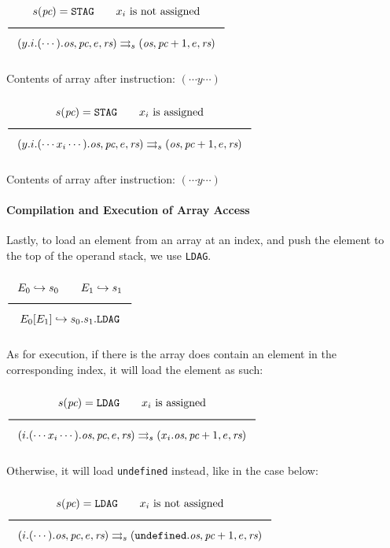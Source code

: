 $\Rule{s(\textit{pc}) = \texttt{STAG} \qquad x_i \text{ is not assigned}}{
(y.i.(\cdots).\textit{os},\textit{pc},e,\textit{rs}) \\
\transition (\textit{os},\textit{pc}+1,e,\textit{rs})}
$

Contents of array after instruction: $(\cdots y \cdots)$

$\Rule{s(\textit{pc}) = \texttt{STAG} \qquad x_i \text{ is assigned}}{
(y.i.(\cdots x_i \cdots).\textit{os},\textit{pc},e,\textit{rs}) \\
\transition (\textit{os},\textit{pc}+1,e,\textit{rs})}
$

Contents of array after instruction: $(\cdots y \cdots)$

\paragraph{Compilation and Execution of Array Access}

Lastly, to load an element from an array at an index,
and push the element to the top of the operand stack, we use \texttt{LDAG}.

$\Rule{
E_0 \translateaux s_0 \qquad E_1 \translateaux s_1}
{E_0\lbrack E_1\rbrack \translateaux s_0.s_1.\texttt{LDAG}}
$

As for execution, if there is the array does contain an element in the
corresponding index, it will load the element as such:

$\Rule{s(\textit{pc}) = \texttt{LDAG} \qquad x_i \text{ is assigned}}{
(i.(\cdots x_i\cdots).\textit{os},\textit{pc},e,\textit{rs}) \transition
(x_i.\textit{os},\textit{pc}+1,e,\textit{rs})}
$

Otherwise, it will load \texttt{undefined} instead, like in the case below:

$\Rule{s(\textit{pc}) = \texttt{LDAG} \qquad x_i \text{ is not assigned}}{
(i.(\cdots).\textit{os},\textit{pc},e,\textit{rs}) \transition
(\texttt{undefined}.\textit{os},\textit{pc}+1,e,\textit{rs})}
$
